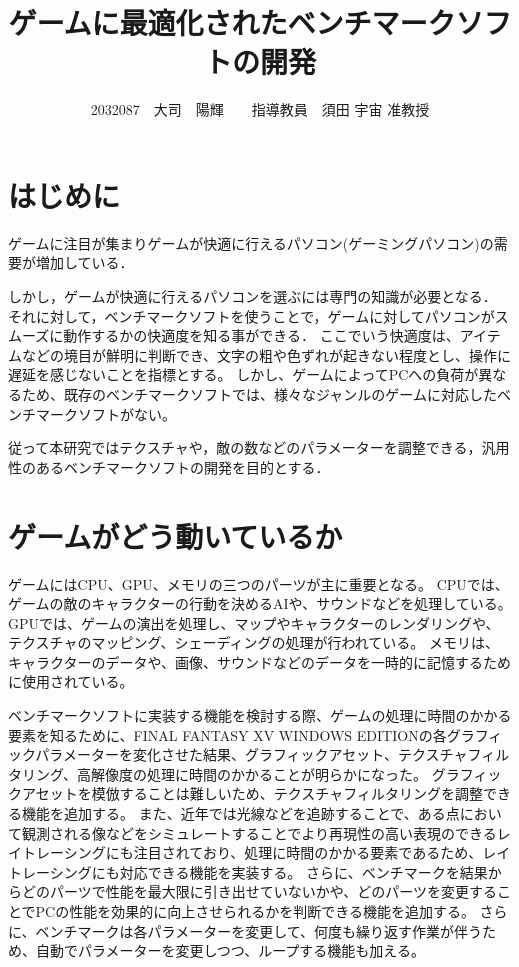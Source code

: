 \documentclass[twocolumn,10pt,a4j]{ltjsarticle}
\title{ゲームに最適化されたベンチマークソフトの開発}
\author{2032087　大司　陽輝　　指導教員　須田 宇宙 准教授}
\date{}
\begin{document}
\maketitle

\section{はじめに}
ゲームに注目が集まりゲームが快適に行えるパソコン(ゲーミングパソコン)の需要が増加している．


しかし，ゲームが快適に行えるパソコンを選ぶには専門の知識が必要となる．
それに対して，ベンチマークソフトを使うことで，ゲームに対してパソコンがスムーズに動作するかの快適度を知る事ができる．
ここでいう快適度は、アイテムなどの境目が鮮明に判断でき、文字の粗や色ずれが起きない程度とし、操作に遅延を感じないことを指標とする。
しかし、ゲームによってPCへの負荷が異なるため、既存のベンチマークソフトでは、様々なジャンルのゲームに対応したベンチマークソフトがない。

従って本研究ではテクスチャや，敵の数などのパラメーターを調整できる，汎用性のあるベンチマークソフトの開発を目的とする．

\section{ゲームがどう動いているか}
ゲームにはCPU、GPU、メモリの三つのパーツが主に重要となる。
CPUでは、ゲームの敵のキャラクターの行動を決めるAIや、サウンドなどを処理している。
GPUでは、ゲームの演出を処理し、マップやキャラクターのレンダリングや、テクスチャのマッピング、シェーディングの処理が行われている。
メモリは、キャラクターのデータや、画像、サウンドなどのデータを一時的に記憶するために使用されている。

ベンチマークソフトに実装する機能を検討する際、ゲームの処理に時間のかかる要素を知るために、FINAL FANTASY XV WINDOWS EDITIONの各グラフィックパラメーターを変化させた結果、グラフィックアセット、テクスチャフィルタリング、高解像度の処理に時間のかかることが明らかになった。
グラフィックアセットを模倣することは難しいため、テクスチャフィルタリングを調整できる機能を追加する。
また、近年では光線などを追跡することで、ある点において観測される像などをシミュレートすることでより再現性の高い表現のできるレイトレーシングにも注目されており、処理に時間のかかる要素であるため、レイトレーシングにも対応できる機能を実装する。
さらに、ベンチマークを結果からどのパーツで性能を最大限に引き出せていないかや、どのパーツを変更することでPCの性能を効果的に向上させられるかを判断できる機能を追加する。
さらに、ベンチマークは各パラメーターを変更して、何度も繰り返す作業が伴うため、自動でパラメーターを変更しつつ、ループする機能も加える。
\end{document}

